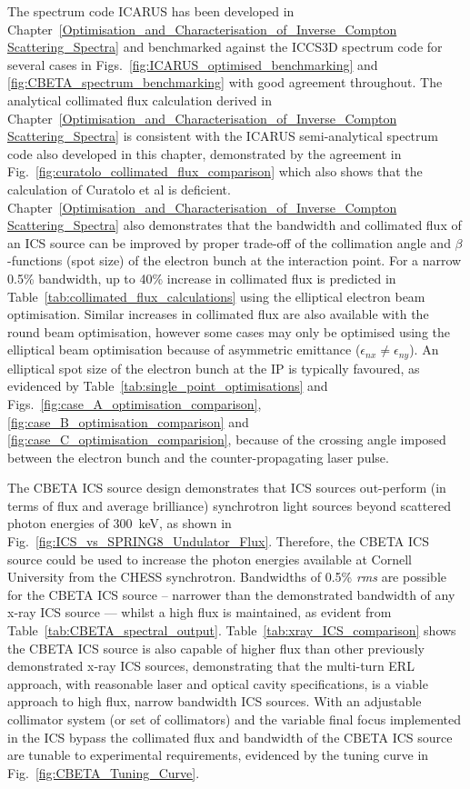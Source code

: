 \documentclass[../main.tex]{subfiles}
\begin{document}
The spectrum code \textsc{ICARUS} has been developed in Chapter~\ref{Optimisation_and_Characterisation_of_Inverse_Compton Scattering_Spectra} and benchmarked against the \textsc{ICCS3D} spectrum code for several cases in Figs.~\ref{fig:ICARUS_optimised_benchmarking} and \ref{fig:CBETA_spectrum_benchmarking} with good agreement throughout. The analytical collimated flux calculation derived in Chapter~\ref{Optimisation_and_Characterisation_of_Inverse_Compton Scattering_Spectra} is consistent with the \textsc{ICARUS} semi-analytical spectrum code also developed in this chapter, demonstrated by the agreement in Fig.~\ref{fig:curatolo_collimated_flux_comparison} which also shows that the calculation of Curatolo et al \cite{curatolo2017analytical} is deficient. Chapter~\ref{Optimisation_and_Characterisation_of_Inverse_Compton Scattering_Spectra} also demonstrates that the bandwidth and collimated flux of an ICS source can be improved by proper trade-off of the collimation angle and $\beta$-functions (spot size) of the electron bunch at the interaction point. For a narrow 0.5\% bandwidth, up to 40\% increase in collimated flux is predicted in Table~\ref{tab:collimated_flux_calculations} using the elliptical electron beam optimisation. Similar increases in collimated flux are also available with the round beam optimisation, however some cases may only be optimised using the elliptical beam optimisation because of asymmetric emittance ($\epsilon_{nx} \neq \epsilon_{ny}$). An elliptical spot size of the electron bunch at the IP is typically favoured, as evidenced by Table~\ref{tab:single_point_optimisations} and Figs.~\ref{fig:case_A_optimisation_comparison}, \ref{fig:case_B_optimisation_comparison} and \ref{fig:case_C_optimisation_comparision}, because of the crossing angle imposed between the electron bunch and the counter-propagating laser pulse. 

The CBETA ICS source design demonstrates that ICS sources out-perform (in terms of flux and average brilliance) synchrotron light sources beyond scattered photon energies of 300~\si{\kilo\electronvolt}, as shown in Fig.~\ref{fig:ICS_vs_SPRING8_Undulator_Flux}. Therefore, the CBETA ICS source could be used to increase the photon energies available at Cornell University from the CHESS synchrotron. Bandwidths of 0.5\% \textit{rms} are possible for the CBETA ICS source -- narrower than the demonstrated bandwidth of any x-ray ICS source --- whilst a high flux is maintained, as evident from Table~\ref{tab:CBETA_spectral_output}. Table~\ref{tab:xray_ICS_comparison} shows the CBETA ICS source is also capable of higher flux than other previously demonstrated x-ray ICS sources, demonstrating that the multi-turn ERL approach, with reasonable laser and optical cavity specifications, is a viable approach to high flux, narrow bandwidth ICS sources. With an adjustable collimator system (or set of collimators) and the variable final focus implemented in the ICS bypass the collimated flux and bandwidth of the CBETA ICS source are tunable to experimental requirements, evidenced by the tuning curve in Fig.~\ref{fig:CBETA_Tuning_Curve}.   
\end{document}

